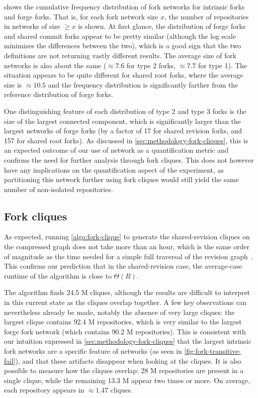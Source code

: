  shows the cumulative frequency
distribution of fork networks for intrinsic forks and forge forks. That is, for
each fork network size $x$, the number of repositories in networks of size
$\geq x$ is shown. At first glance, the distribution of forge forks and shared
commit forks appear to be pretty similar (although the log scale minimizes the
differences between the two), which is a good sign that the two definitions are
not returning vastly different results. The average size of fork networks is
also about the same ($\approx 7.6$ for type 2 forks, $\approx 7.7$ for type 1).
The situation appears to be quite different for shared root forks, where the
average size is $\approx 10.5$ and the frequency distribution is significantly
farther from the reference distribution of forge forks.

One distinguishing feature of each distribution of type 2 and type 3 forks is
the size of the largest connected component, which is significantly larger than
the largest networks of forge forks (by a factor of 17 for shared revision
forks, and 157 for shared root forks). As discussed in
\cref{sec:methodology-fork-cliques}, this is an expected outcome of our
use of network as a quantification metric and confirms the need for further
analysis through fork cliques.  This does not however have any implications on
the quantification aspect of the experiment, as partitioning this network
further using fork cliques would still yield the same number of non-isolated
repositories.


\subsection{Fork cliques}

As expected, running \cref{algo:fork-clique} to generate the
shared-revision cliques on the compressed graph does not take more than an
hour, which is the same order of magnitude as the time needed for a simple full
traversal of the revision graph~\cite{saner-2020-swh-graph}. This confirms our
prediction that in the shared-revision case, the average-case runtime of the
algorithm is close to $\Theta(R)$.

The algorithm finds 24.5 M cliques, although the results are difficult to
interpret in this current state as the cliques overlap together. A few
key observations can nevertheless already be made, notably the absence of very
large cliques: the largest clique contains 92.4 M repositories, which is very
similar to the largest forge fork network (which contains 90.2 M repositories).
This is consistent with our intuition expressed in
\cref{sec:methodology-fork-cliques} that the largest intrinsic fork
networks are a specific feature of networks (as seen in
\cref{fig:fork-transitive-fail}), and that these artifacts disappear when
looking at the cliques. It is also possible to measure how the cliques overlap:
28 M repositories are present in a single clique, while the remaining 13.3 M
appear two times or more. On average, each repository appears in $\approx 1.47$
cliques.

